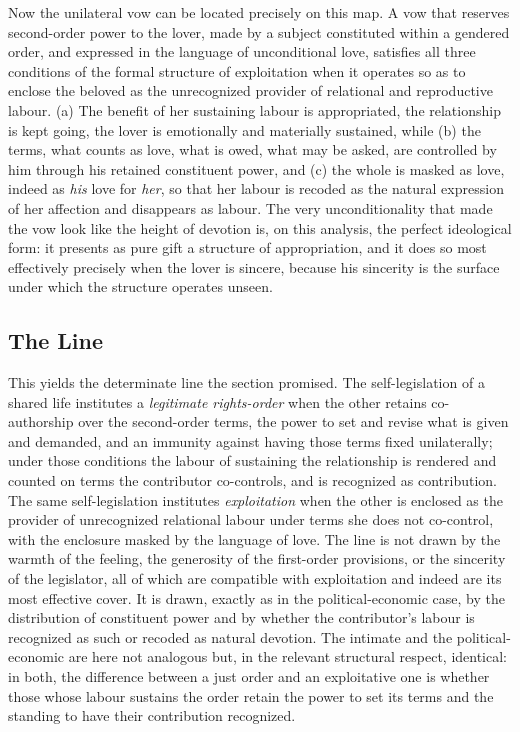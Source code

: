 \documentclass[11pt,a4paper]{article}
\begin{document}
Now the unilateral vow can be located precisely on this map. A vow that reserves second-order power to the lover, made by a subject constituted within a gendered order, and expressed in the language of unconditional love, satisfies all three conditions of the formal structure of exploitation when it operates so as to enclose the beloved as the unrecognized provider of relational and reproductive labour. (a) The benefit of her sustaining labour is appropriated, the relationship is kept going, the lover is emotionally and materially sustained, while (b) the terms, what counts as love, what is owed, what may be asked, are controlled by him through his retained constituent power, and (c) the whole is masked as love, indeed as \emph{his} love for \emph{her}, so that her labour is recoded as the natural expression of her affection and disappears as labour. The very unconditionality that made the vow look like the height of devotion is, on this analysis, the perfect ideological form: it presents as pure gift a structure of appropriation, and it does so most effectively precisely when the lover is sincere, because his sincerity is the surface under which the structure operates unseen.

\subsection{The Line}

This yields the determinate line the section promised. The self-legislation of a shared life institutes a \emph{legitimate rights-order} when the other retains co-authorship over the second-order terms, the power to set and revise what is given and demanded, and an immunity against having those terms fixed unilaterally; under those conditions the labour of sustaining the relationship is rendered and counted on terms the contributor co-controls, and is recognized as contribution. The same self-legislation institutes \emph{exploitation} when the other is enclosed as the provider of unrecognized relational labour under terms she does not co-control, with the enclosure masked by the language of love. The line is not drawn by the warmth of the feeling, the generosity of the first-order provisions, or the sincerity of the legislator, all of which are compatible with exploitation and indeed are its most effective cover. It is drawn, exactly as in the political-economic case, by the distribution of constituent power and by whether the contributor's labour is recognized as such or recoded as natural devotion. The intimate and the political-economic are here not analogous but, in the relevant structural respect, identical: in both, the difference between a just order and an exploitative one is whether those whose labour sustains the order retain the power to set its terms and the standing to have their contribution recognized.
\end{document}
